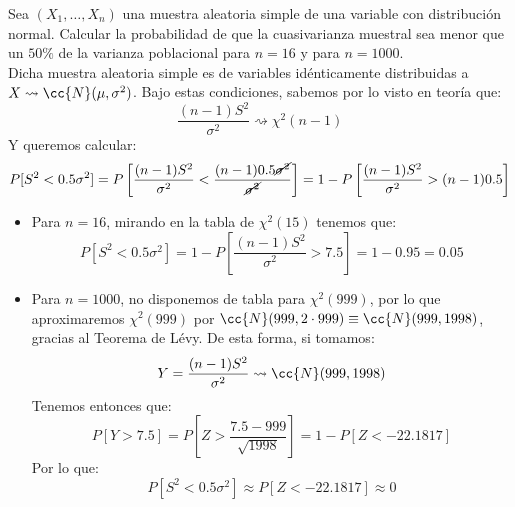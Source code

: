 \begin{ejercicio}
    Sea $(X_1, \ldots, X_n)$ una muestra aleatoria simple de una variable con distribución normal.  Calcular la probabilidad de que la cuasivarianza muestral sea menor que un $50\%$ de la varianza poblacional para $n = 16$ y para $n = 1000$.\\

    \noindent
    Dicha muestra aleatoria simple es de variables idénticamente distribuidas a $X\rightsquigarrow\cc{N}(\mu, \sigma^2)$. Bajo estas condiciones, sabemos por lo visto en teoría que:
    \begin{equation*}
        \dfrac{(n-1)S^2}{\sigma^2} \rightsquigarrow\chi^2(n-1)
    \end{equation*}
    Y queremos calcular:
    \begin{align*}
        P[S^2 < 0.5\sigma^2] = P\left[\dfrac{(n-1)S^2}{\sigma^2} < \dfrac{(n-1)0.5\cancel{\sigma^2}}{\cancel{\sigma^2}}\right] = 1-P\left[\dfrac{(n-1)S^2}{\sigma^2} > (n-1)0.5\right]
    \end{align*}
    \begin{itemize}
        \item Para $n=16$, mirando en la tabla de $\chi^2(15)$ tenemos que:
            \begin{equation*}
                P[S^2 < 0.5\sigma^2] = 1-P\left[\dfrac{(n-1)S^2}{\sigma^2} > 7.5\right] = 1-0.95 = 0.05
            \end{equation*}
        \item Para $n=1000$, no disponemos de tabla para $\chi^2(999)$, por lo que aproximaremos $\chi^2(999)$ por $\cc{N}(999, 2\cdot 999)\equiv \cc{N}(999, 1998)$, gracias al Teorema de Lévy. De esta forma, si tomamos:
            \begin{equation*}
                Y = \dfrac{(n-1)S^2}{\sigma^2}\rightsquigarrow\cc{N}(999, 1998)
            \end{equation*}
            Tenemos entonces que:
            \begin{equation*}
                P[Y>7.5] = P\left[Z>\dfrac{7.5-999}{\sqrt{1998}}\right] = 1-P[Z< -22.1817]
            \end{equation*}
            Por lo que:
            \begin{equation*}
                P[S^2 < 0.5\sigma^2] \approx P[Z< -22.1817] \approx 0
            \end{equation*}
    \end{itemize}
\end{ejercicio}

